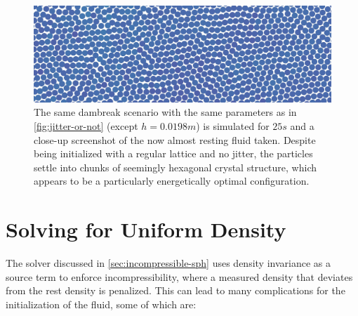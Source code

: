\begin{figure}
  \centering
  \includegraphics*[width=\textwidth]{images/initial/natural-hex-wide.jpg}
  \caption{The same dambreak scenario with the same parameters as in \autoref{fig:jitter-or-not} (except $h=0.0198m$) is simulated for $25s$ and a close-up screenshot of the now almost resting fluid taken. Despite being initialized with a regular lattice and no jitter, the particles settle into chunks of seemingly hexagonal crystal structure, which appears to be a particularly energetically optimal configuration.}
  \label{fig:natural-hexagons}
\end{figure}




\newpage

\section{Solving for Uniform Density}\label{sec:equilibrate-density}

The solver discussed in \autoref*{sec:incompressible-sph} uses density invariance as a source term to enforce incompressibility, where a measured density that deviates from the rest density is penalized. This can lead to many complications for the initialization of the fluid, some of which are:

